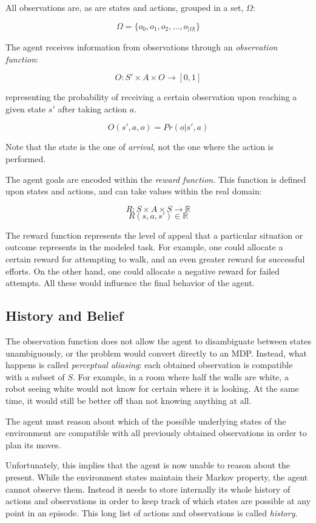 All observations are, as are states and actions, grouped in a set, $\Omega$:

\[ \Omega = \{ o_0, o_1, o_2, ..., o_{|\Omega|} \} \]

The agent receives information from observations through an \textit{observation function}:

\[ O : S' \times A \times O \rightarrow [0,1] \]

representing the probability of receiving a certain observation upon reaching a given state $s'$
after taking action $a$.

\[ O(s', a, o) = Pr(o | s', a) \]

Note that the state is the one of \textit{arrival}, not the one where the action is performed.

The agent goals are encoded within the \textit{reward function}.  This function is defined upon
states and actions, and can take values within the real domain:

\[ R: S\times A\times S \rightarrow \mathbb{R} \]
\[ R(s, a, s') \in \mathbb{R} \]

The reward function represents the level of appeal that a particular situation or outcome represents
in the modeled task. For example, one could allocate a certain reward for attempting to walk, and an
even greater reward for successful efforts. On the other hand, one could allocate a negative reward
for failed attempts. All these would influence the final behavior of the agent.

\subsection{History and Belief}

The observation function does not allow the agent to disambiguate between states unambiguously, or
the problem would convert directly to an MDP. Instead, what happens is called \textit{perceptual
aliasing}: each obtained observation is compatible with a subset of $S$. For example, in a room
where half the walls are white, a robot seeing white would not know for certain where it is looking.
At the same time, it would still be better off than not knowing anything at all. 

The agent must reason about which of the possible underlying states of the environment are
compatible with all previously obtained observations in order to plan its moves.

Unfortunately, this implies that the agent is now unable to reason about the present. While the
environment states maintain their Markov property, the agent cannot observe them. Instead it needs
to store internally its whole history of actions and observations in order to keep track of which
states are possible at any point in an episode. This long list of actions and observations is called
\textit{history}.

